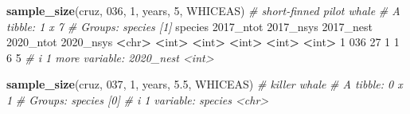 \documentclass[
]{book}
\newenvironment{Shaded}{\begin{snugshade}}{\end{snugshade}}
\newcommand{\AttributeTok}[1]{\textcolor[rgb]{0.13,0.29,0.53}{#1}}
\newcommand{\CommentTok}[1]{\textcolor[rgb]{0.56,0.35,0.01}{\textit{#1}}}
\newcommand{\DecValTok}[1]{\textcolor[rgb]{0.00,0.00,0.81}{#1}}
\newcommand{\ErrorTok}[1]{\textcolor[rgb]{0.64,0.00,0.00}{\textbf{#1}}}
\newcommand{\FloatTok}[1]{\textcolor[rgb]{0.00,0.00,0.81}{#1}}
\newcommand{\FunctionTok}[1]{\textcolor[rgb]{0.13,0.29,0.53}{\textbf{#1}}}
\newcommand{\NormalTok}[1]{#1}
\newcommand{\SpecialCharTok}[1]{\textcolor[rgb]{0.81,0.36,0.00}{\textbf{#1}}}
\newcommand{\StringTok}[1]{\textcolor[rgb]{0.31,0.60,0.02}{#1}}
\begin{document}
\begin{Shaded}
\begin{Highlighting}[]
\FunctionTok{sample\_size}\NormalTok{(cruz, }\StringTok{\textquotesingle{}036\textquotesingle{}}\NormalTok{, }\DecValTok{1}\NormalTok{, years, }\DecValTok{5}\NormalTok{, }\StringTok{\textquotesingle{}WHICEAS\textquotesingle{}}\NormalTok{) }\CommentTok{\# short{-}finned pilot whale}
\CommentTok{\# A tibble: 1 x 7}
\CommentTok{\# Groups:   species [1]}
\NormalTok{  species }\StringTok{\textasciigrave{}}\AttributeTok{2017\_ntot}\StringTok{\textasciigrave{}} \StringTok{\textasciigrave{}}\AttributeTok{2017\_nsys}\StringTok{\textasciigrave{}} \StringTok{\textasciigrave{}}\AttributeTok{2017\_nest}\StringTok{\textasciigrave{}} \StringTok{\textasciigrave{}}\AttributeTok{2020\_ntot}\StringTok{\textasciigrave{}} \StringTok{\textasciigrave{}}\AttributeTok{2020\_nsys}\StringTok{\textasciigrave{}}
  \SpecialCharTok{\textless{}}\NormalTok{chr}\SpecialCharTok{\textgreater{}}         \ErrorTok{\textless{}}\NormalTok{int}\SpecialCharTok{\textgreater{}}       \ErrorTok{\textless{}}\NormalTok{int}\SpecialCharTok{\textgreater{}}       \ErrorTok{\textless{}}\NormalTok{int}\SpecialCharTok{\textgreater{}}       \ErrorTok{\textless{}}\NormalTok{int}\SpecialCharTok{\textgreater{}}       \ErrorTok{\textless{}}\NormalTok{int}\SpecialCharTok{\textgreater{}}
\DecValTok{1} \DecValTok{036}              \DecValTok{27}           \DecValTok{1}           \DecValTok{1}           \DecValTok{6}           \DecValTok{5}
\CommentTok{\# i 1 more variable: \textasciigrave{}2020\_nest\textasciigrave{} \textless{}int\textgreater{}}

\FunctionTok{sample\_size}\NormalTok{(cruz, }\StringTok{\textquotesingle{}037\textquotesingle{}}\NormalTok{, }\DecValTok{1}\NormalTok{, years, }\FloatTok{5.5}\NormalTok{, }\StringTok{\textquotesingle{}WHICEAS\textquotesingle{}}\NormalTok{) }\CommentTok{\# killer whale}
\CommentTok{\# A tibble: 0 x 1}
\CommentTok{\# Groups:   species [0]}
\CommentTok{\# i 1 variable: species \textless{}chr\textgreater{}}


\end{Highlighting}
\end{Shaded}
\end{document}
